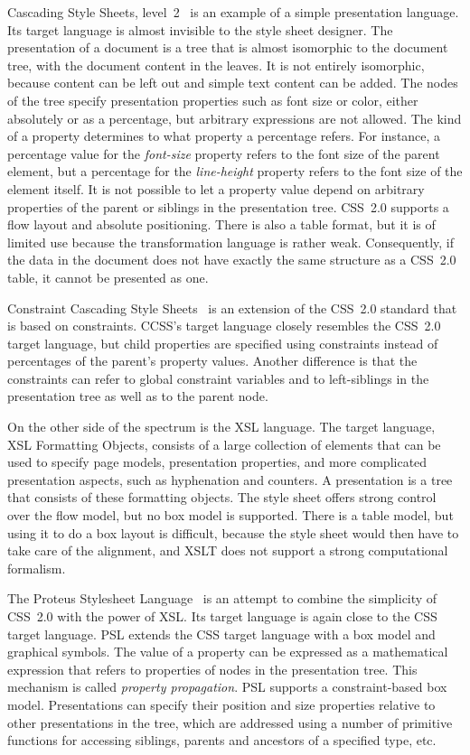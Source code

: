  Cascading Style Sheets, level~2~\cite{css} is an example of a simple presentation language. Its target language is almost invisible to the style sheet designer. The presentation of a document is a tree that is almost isomorphic to the document tree, with the document content in the leaves. It is not entirely isomorphic, because content can be left out and simple text content can be added. The nodes of the tree specify presentation properties such as font size or color, either absolutely or as a percentage, but arbitrary expressions are not allowed. The kind of a property determines to what property a percentage refers. For instance, a percentage value for the {\em font-size} property refers to the font size of the parent element, but a percentage for the {\em line-height} property refers to the font size of the element itself. It is not possible to let a property value depend on arbitrary properties of the parent or siblings in the presentation tree. CSS~2.0 supports a flow layout and absolute positioning. There is also a table format, but it is of limited use because the transformation language is rather weak. Consequently, if the data in the document does not have exactly the same structure as a CSS~2.0 table, it cannot be presented as one.

 Constraint Cascading Style Sheets~\cite{ccss} is an extension of the CSS~2.0 standard that is based on constraints. CCSS's target language closely resembles the CSS~2.0 target language, but child properties are specified using constraints instead of percentages of the parent's property values. Another difference is that the constraints can refer to global constraint variables and to left-siblings in the presentation tree as well as to the parent node. 

 On the other side of the spectrum is the XSL language. The target language, XSL Formatting Objects, consists of a large collection of elements that can be used to specify page models, presentation properties, and more complicated presentation aspects, such as hyphenation and counters. A presentation is a tree that consists of these formatting objects. The style sheet offers strong control over the flow model, but no box model is supported. There is a table model, but using it to do a box layout is difficult, because the style sheet would then have to take care of the alignment, and XSLT does not support a strong computational formalism.

 The Proteus Stylesheet Language~\cite{psl} is an attempt to combine the simplicity of CSS~2.0 with the power of XSL. Its target language is again close to the CSS target language. PSL extends the CSS target language with a box model and graphical symbols. The value of a property can be expressed as a mathematical expression that refers to properties of nodes in the presentation tree. This mechanism is called {\em property propagation}. PSL supports a constraint-based box model. Presentations can specify their position and size properties relative to other presentations in the tree, which are addressed using a number of primitive functions for accessing siblings, parents and ancestors of a specified type, etc.

